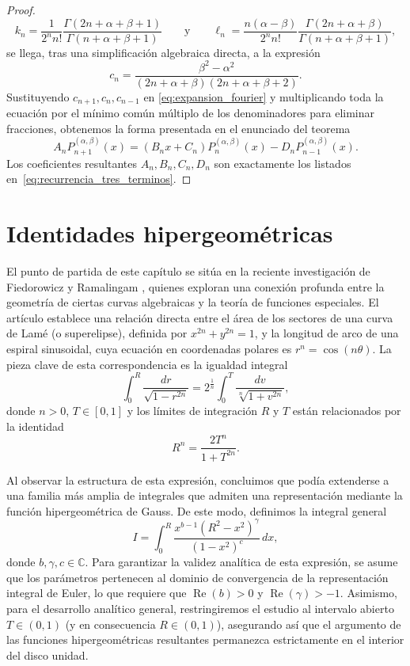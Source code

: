 \documentclass[12pt,a4paper]{book}
\begin{document}
\begin{proof}
\[
k_n = \frac{1}{2^n n!} \frac{\Gamma(2n+\alpha+\beta+1)}{\Gamma(n+\alpha+\beta+1)} \qquad \text{y} \qquad \ell_n = \frac{n(\alpha-\beta)}{2^n n!} \frac{\Gamma(2n+\alpha+\beta)}{\Gamma(n+\alpha+\beta+1)},
\]
se llega, tras una simplificación algebraica directa, a la expresión
\[
c_n = \frac{\beta^2 - \alpha^2}{(2n+\alpha+\beta)(2n+\alpha+\beta+2)}.
\]
Sustituyendo $c_{n+1}, c_n, c_{n-1}$ en \eqref{eq:expansion_fourier} y multiplicando toda la ecuación por el mínimo común múltiplo de los denominadores para eliminar fracciones, obtenemos la forma presentada en el enunciado del teorema
\[
A_n P_{n+1}^{(\alpha, \beta)}(x) = (B_n x + C_n) P_n^{(\alpha, \beta)}(x) - D_n P_{n-1}^{(\alpha, \beta)}(x).
\]
Los coeficientes resultantes $A_n, B_n, C_n, D_n$ son exactamente los listados en~\eqref{eq:recurrencia_tres_terminos}.
\end{proof}


\chapter{Identidades hipergeométricas}

El punto de partida de este capítulo se sitúa en la reciente investigación de Fiedorowicz y Ramalingam \cite{fiedorowicz2026generalizations}, quienes exploran una conexión profunda entre la geometría de ciertas curvas algebraicas y la teoría de funciones especiales. El artículo establece una relación directa entre el área de los sectores de una curva de Lamé (o superelipse), definida por $x^{2n} + y^{2n} = 1$, y la longitud de arco de una espiral sinusoidal, cuya ecuación en coordenadas polares es $r^n = \cos(n\theta)$. La pieza clave de esta correspondencia es la igualdad integral
\[
\int_{0}^{R}\frac{dr}{\sqrt{1-r^{2n}}}=2^{\frac{1}{n}}\int_{0}^{T}\frac{dv}{\sqrt[n]{1+v^{2n}}},
\]
donde $n > 0$, $T \in [0, 1]$ y los límites de integración $R$ y $T$ están relacionados por la identidad
\[
R^n = \frac{2T^n}{1+T^{2n}}.
\]

Al observar la estructura de esta expresión, concluimos que podía extenderse a una familia más amplia de integrales que admiten una representación mediante la función hipergeométrica de Gauss. De este modo, definimos la integral general
\begin{equation}
\label{eq:integral_general_cap3}
I = \int_{0}^{R} \frac{x^{b-1} (R^2 - x^2)^\gamma}{(1 - x^2)^c} \, dx,
\end{equation}
donde $b,\gamma, c \in \mathbb{C}$. 
Para garantizar la validez analítica de esta expresión, se asume que los parámetros pertenecen al dominio de convergencia de la representación integral de Euler, lo que requiere que $\operatorname{Re}(b) > 0$ y $\operatorname{Re}(\gamma) > -1$. Asimismo, para el desarrollo analítico general, restringiremos el estudio al intervalo abierto $T \in (0, 1)$ (y en consecuencia $R \in (0, 1)$), asegurando así que el argumento de las funciones hipergeométricas resultantes permanezca estrictamente en el interior del disco unidad.
\end{document}
